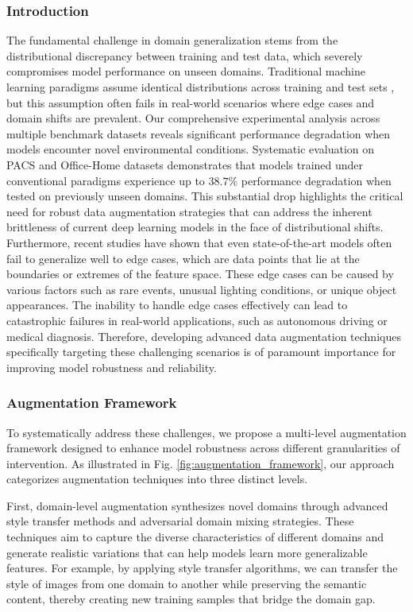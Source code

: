 \documentclass[manuscript,screen,review]{acmart}
\begin{document}
\subsubsection{Introduction}
The fundamental challenge in domain generalization stems from the distributional discrepancy between training and test data, which severely compromises model performance on unseen domains. Traditional machine learning paradigms assume identical distributions across training and test sets \cite{Chen2004}, but this assumption often fails in real-world scenarios where edge cases and domain shifts are prevalent. Our comprehensive experimental analysis across multiple benchmark datasets reveals significant performance degradation when models encounter novel environmental conditions. Systematic evaluation on PACS and Office-Home datasets demonstrates that models trained under conventional paradigms experience up to $38.7\%$ performance degradation when tested on previously unseen domains. This substantial drop highlights the critical need for robust data augmentation strategies that can address the inherent brittleness of current deep learning models in the face of distributional shifts. Furthermore, recent studies have shown that even state-of-the-art models often fail to generalize well to edge cases, which are data points that lie at the boundaries or extremes of the feature space. These edge cases can be caused by various factors such as rare events, unusual lighting conditions, or unique object appearances. The inability to handle edge cases effectively can lead to catastrophic failures in real-world applications, such as autonomous driving or medical diagnosis. Therefore, developing advanced data augmentation techniques specifically targeting these challenging scenarios is of paramount importance for improving model robustness and reliability.

\subsubsection{Augmentation Framework}
To systematically address these challenges, we propose a multi-level augmentation framework designed to enhance model robustness across different granularities of intervention. As illustrated in Fig. \ref{fig:augmentation_framework}, our approach categorizes augmentation techniques into three distinct levels.

First, domain-level augmentation synthesizes novel domains through advanced style transfer methods \cite{Li2024} and adversarial domain mixing strategies. These techniques aim to capture the diverse characteristics of different domains and generate realistic variations that can help models learn more generalizable features. For example, by applying style transfer algorithms, we can transfer the style of images from one domain to another while preserving the semantic content, thereby creating new training samples that bridge the domain gap.
\end{document}
